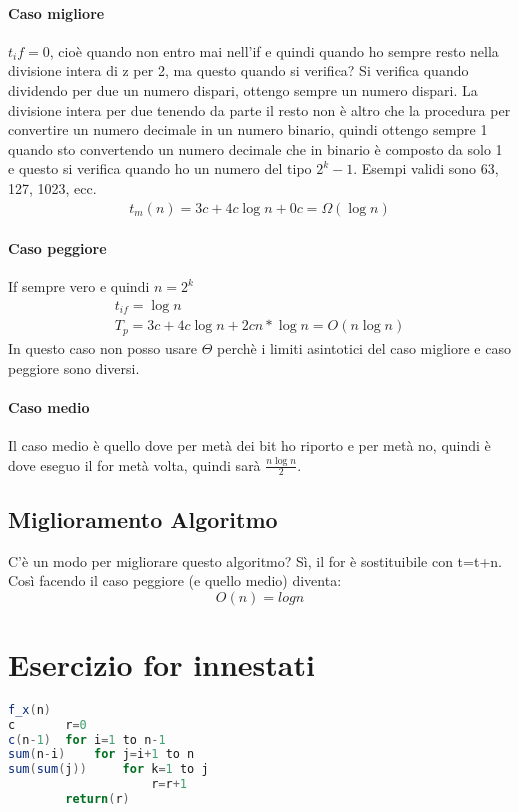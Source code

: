 \paragraph*{Caso migliore} $t_if = 0$, cioè quando non entro mai nell'if e quindi quando ho
sempre resto nella divisione intera di z per 2, ma questo quando si verifica? Si verifica quando
dividendo per due un numero dispari, ottengo sempre un numero dispari. La divisione intera per due tenendo
da parte il resto non è altro che la procedura per convertire un numero decimale in un numero binario, quindi
ottengo sempre 1 quando sto convertendo un numero decimale che in binario è composto da solo 1 e questo si verifica
quando ho un numero del tipo $2^k - 1$. Esempi validi sono 63, 127, 1023, ecc.\\
\begin{align*}
    t_m(n)=3c+4c \log n + 0c = \Omega(\log n)
\end{align*}
\paragraph*{Caso peggiore} If sempre vero e quindi $n=2^k$
\begin{align*}
    t_{if}=\log n\\
    T_p=3c+4c\log n + 2cn*\log n = O(n\log n)
\end{align*}
In questo caso non posso usare $\Theta$ perchè i limiti asintotici del caso migliore e caso
peggiore sono diversi.
\paragraph*{Caso medio}
Il caso medio è quello dove per metà dei bit ho riporto e per metà no, quindi è dove eseguo il for
metà volta, quindi sarà $\frac{n \log n}{2}$.
\subsection{Miglioramento Algoritmo}
C'è un modo per migliorare questo algoritmo? Sì, il for è sostituibile con t=t+n.\\
Così facendo il caso peggiore (e quello medio) diventa:
\begin{equation*}
    O(n)=log n
\end{equation*}
\section{Esercizio for innestati}
\begin{lstlisting}[language=Java]
    f_x(n)
c       r=0
c(n-1)  for i=1 to n-1
sum(n-i)    for j=i+1 to n
sum(sum(j))     for k=1 to j
                    r=r+1
        return(r)
\end{lstlisting}
